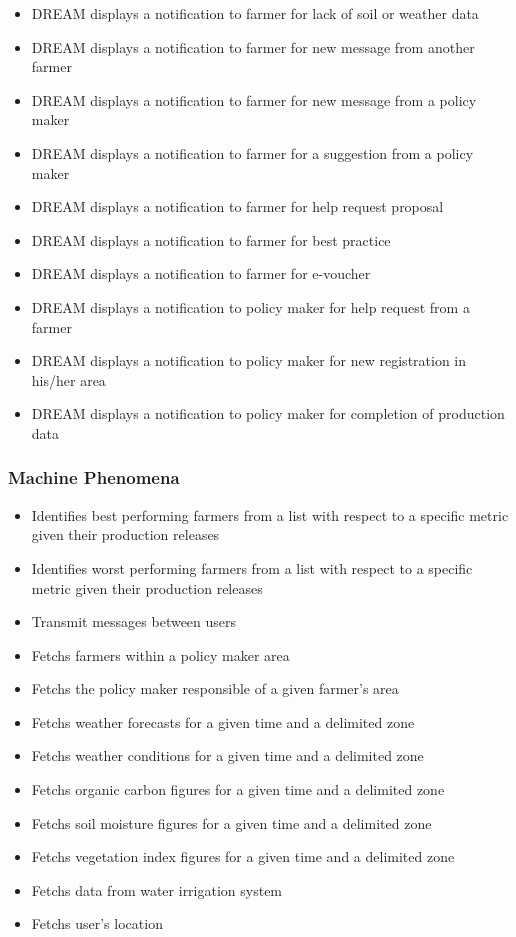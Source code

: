 \begin{itemize}
	\item
	DREAM displays a notification to farmer for lack of soil or weather data
	\item
	DREAM displays a notification to farmer for new message from another farmer
	\item
	DREAM displays a notification to farmer for new message from a policy maker
	\item
	DREAM displays a notification to farmer for a suggestion from a policy maker
	\item
	DREAM displays a notification to farmer for help request proposal
	\item
	DREAM displays a notification to farmer for best practice
	\item
	DREAM displays a notification to farmer for e-voucher
	\item
	DREAM displays a notification to policy maker for help request from a farmer
	\item
	DREAM displays a notification to policy maker for new registration in his/her area
	\item
	DREAM displays a notification to policy maker for completion of production data
	
\end{itemize}

\subsubsection{Machine Phenomena}
\begin{itemize}
	\item 
	Identifies best performing farmers from a list with respect to a specific metric given their production releases
	\item 
	Identifies worst performing farmers from a list with respect to a specific metric given their production releases
	\item 
	Transmit messages between users
	\item
	Fetchs farmers within a policy maker area
	\item
	Fetchs the policy maker responsible of a given farmer's area
	\item 
	Fetchs weather forecasts for a given time and a delimited zone
	\item
	Fetchs weather conditions for a given time and a delimited zone
	\item
	Fetchs organic carbon figures for a given time and a delimited zone
	\item
	Fetchs soil moisture figures for a given time and a delimited zone
	\item
	Fetchs vegetation index figures for a given time and a delimited zone
	\item 
	Fetchs data from water irrigation system
	\item 
	Fetchs user's location
	
\end{itemize}

